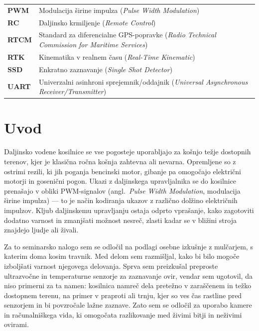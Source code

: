 \documentclass[12pt]{article}
\newcommand{\arabicpages}{%
    \pagenumbering{arabic}%
    \setcounter{page}{8}%
}
\begin{document}
\begin{samepage}
\begin{tabularx}{\textwidth}{@{}lX@{}}
  \textbf{PWM}   & Modulacija širine impulza
                   (\textit{Pulse Width Modulation}) \\
  \textbf{RC}    & Daljinsko krmiljenje (\textit{Remote Control}) \\
  \textbf{RTCM}  & Standard za diferencialne GPS-popravke
                   (\textit{Radio Technical Commission for Maritime
                   Services}) \\
  \textbf{RTK}   & Kinematika v realnem času
                   (\textit{Real-Time Kinematic}) \\
  \textbf{SSD}   & Enkratno zaznavanje (\textit{Single Shot Detector}) \\
  \textbf{UART}  & Univerzalni asinhroni sprejemnik/oddajnik
                   (\textit{Universal Asynchronous Receiver/Transmitter}) \\
\end{tabularx}
\endgroup
\end{samepage}

\newpage
\arabicpages
\section{Uvod}

Daljinsko vodene kosilnice se vse pogosteje uporabljajo za košnjo
težje dostopnih terenov, kjer je klasična ročna košnja zahtevna ali
nevarna. Opremljene so z ostrimi rezili, ki jih poganja bencinski
motor, gibanje pa omogočajo električni motorji in gosenični pogon.
Ukazi z daljinskega upravljalnika se do kosilnice prenašajo v obliki
PWM-signalov (angl.\ \textit{Pulse Width Modulation}, modulacija
širine impulza) --- to je način kodiranja ukazov z različno dolžino
električnih impulzov. Kljub daljinskemu upravljanju ostaja odprto
vprašanje, kako zagotoviti dodatno varnost in zmanjšati možnost
nesreč, zlasti kadar se v bližini stroja znajdejo ljudje ali živali.

Za to seminarsko nalogo sem se odločil na podlagi osebne izkušnje z
mulčarjem, s katerim doma kosim travnik. Med delom sem razmišljal, kako
bi bilo mogoče izboljšati varnost njegovega delovanja. Sprva sem
preizkušal preproste ultrazvočne in temperaturne senzorje za
zaznavanje ovir, vendar sem ugotovil, da niso primerni za ta namen:
kosilnica namreč dela pretežno v zaraščenem in težko dostopnem terenu,
na primer v praproti ali trnju, kjer so ves čas rastline pred
senzorjem in bi povzročale lažne zaznave. Zato sem se odločil za uporabo kamere in računalniškega
vida, ki omogočata razlikovanje med živimi bitji in neživimi
ovirami.
\end{document}
